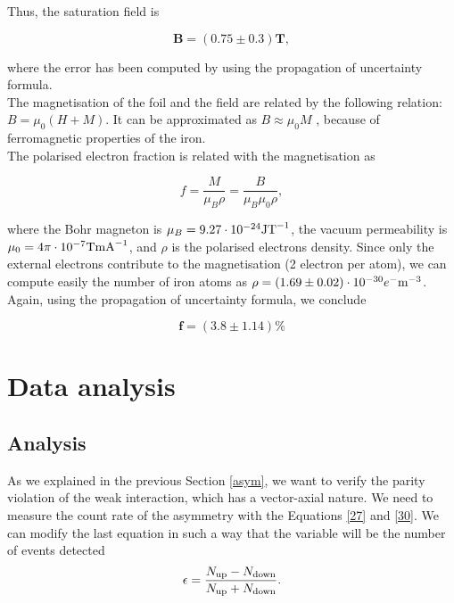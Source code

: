 \documentclass[10pt,swedish, openany]{book}
\begin{document}
Thus, the saturation field is

\begin{equation*}
    \mathbf{B = (0.75 \pm 0.3)T},
\end{equation*}

where the error has been computed by using the propagation of uncertainty formula.\\

The magnetisation of the foil and the field are related by the following relation: $B = \mu_0 (H+M)$. It can be approximated as $B \approx \mu_0 M$ , because of ferromagnetic properties of the iron.\\

The polarised electron fraction is related with the magnetisation as

\begin{equation}
    f = \frac{M}{\mu_B \rho} = \frac{B}{\mu_B \mu_0 \rho},
\end{equation}

where the Bohr magneton is $\mu_B = 9.27 \cdot 10^{-24} {\rm JT}^{-1}$, the vacuum permeability is $\mu_0 = 4 \pi \cdot 10^{-7} {\rm TmA}^{-1}$, and $\rho$ is the polarised electrons density. Since only the external electrons contribute to the magnetisation (2 electron per atom), we can compute easily the number of iron atoms as $\rho = (1.69 \pm 0.02) \cdot 10^{-30} e^-{\rm m}^{-3}$.\\

Again, using the propagation of uncertainty formula, we conclude

\begin{equation*}
    \mathbf{f = (3.8 \pm 1.14)\%}
\end{equation*}

\chapter{Data analysis}

\section{Analysis}

As we explained in the previous Section \ref{asym}, we want to verify the parity violation of the weak interaction, which has a vector-axial nature. We need to measure the count rate of the asymmetry with the Equations \ref{27} and \ref{30}. We can modify the last equation in such a way that the variable will be the number of events detected
\begin{equation}\label{epsi}
   \epsilon = \frac{N_{\rm up}-N_{\rm down}}{N_{\rm up}+N_{\rm down}} .
\end{equation}
\end{document}

